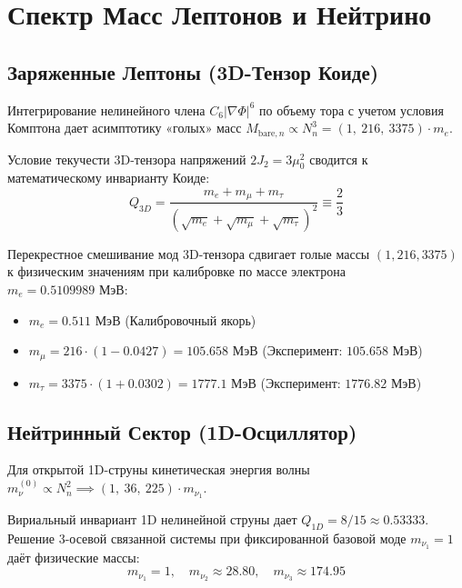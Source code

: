 \documentclass[12pt,a4paper]{article}
\begin{document}
			\section{Спектр Масс Лептонов и Нейтрино}
			
			\subsection{Заряженные Лептоны (3D-Тензор Коиде)}
			Интегрирование нелинейного члена $C_6 |\nabla \Phi|^6$ по объему тора с учетом условия Комптона дает асимптотику «голых» масс $M_{\text{bare}, n} \propto N_n^3 = (1, \ 216, \ 3375) \cdot m_e$.
			
			Условие текучести 3D-тензора напряжений $2J_2 = 3\mu_0^2$ сводится к математическому инварианту Коиде:
			\begin{equation}
				Q_{3D} = \frac{m_e + m_\mu + m_\tau}{(\sqrt{m_e} + \sqrt{m_\mu} + \sqrt{m_\tau})^2} \equiv \frac{2}{3}
			\end{equation}
			
			Перекрестное смешивание мод 3D-тензора сдвигает голые массы $(1, 216, 3375)$ к физическим значениям при калибровке по массе электрона $m_e = 0.5109989 \text{ МэВ}$:
			\begin{itemize}
				\item $m_e = 0.511 \text{ МэВ}$ (Калибровочный якорь)
				\item $m_\mu = 216 \cdot (1 - 0.0427) = \mathbf{105.658 \text{ МэВ}}$ (Эксперимент: $105.658 \text{ МэВ}$)
				\item $m_\tau = 3375 \cdot (1 + 0.0302) = \mathbf{1777.1 \text{ МэВ}}$ (Эксперимент: $1776.82 \text{ МэВ}$)
			\end{itemize}
			
			\subsection{Нейтринный Сектор (1D-Осциллятор)}
			Для открытой 1D-струны кинетическая энергия волны $m_\nu^{(0)} \propto N_n^2 \implies (1, \ 36, \ 225) \cdot m_{\nu_1}$. 
			
			Вириальный инвариант 1D нелинейной струны дает $Q_{1D} = 8/15 \approx 0.53333$. Решение 3-осевой связанной системы при фиксированной базовой моде $m_{\nu_1} = 1$ даёт физические массы:
			\begin{equation}
				m_{\nu_1} = 1, \quad m_{\nu_2} \approx 28.80, \quad m_{\nu_3} \approx 174.95
			\end{equation}
			
\end{document}
